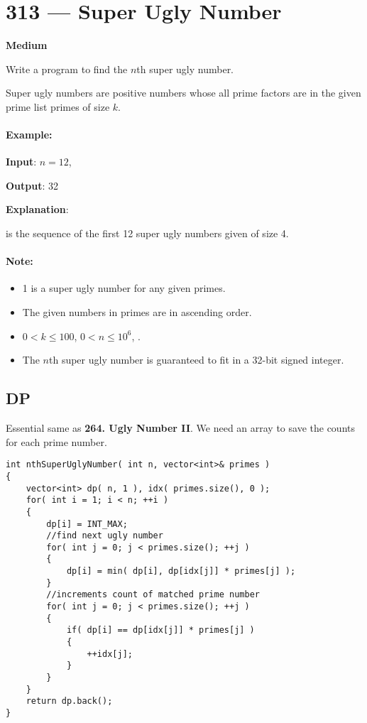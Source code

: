 \section{313 --- Super Ugly Number}

\textbf{Medium}

Write a program to find the $n$th super ugly number.

Super ugly numbers are positive numbers whose all prime factors are in the given prime list primes of size $k$.

\paragraph{Example:}

\begin{flushleft}
\textbf{Input}: $ n = 12 $, 

\textbf{Output}: 32 

\textbf{Explanation}: 

\fcj{[1,2,4,7,8,13,14,16,19,26,28,32]} is the sequence of the first 12 super ugly numbers given  of size 4.
\end{flushleft}

\paragraph{Note:}

\begin{itemize}
\item 1 is a super ugly number for any given primes.
\item The given numbers in primes are in ascending order.
\item $0 < k \leq 100$, $0 < n \leq 10^6$, .
\item The $n$th super ugly number is guaranteed to fit in a 32-bit signed integer.
\end{itemize}

\subsection{DP}
Essential same as \textbf{264. Ugly Number II}. We need an array to save the counts for each prime number.

\setcounter{lstlisting}{0}
\begin{lstlisting}[style=customc, caption={DP}]
int nthSuperUglyNumber( int n, vector<int>& primes )
{
    vector<int> dp( n, 1 ), idx( primes.size(), 0 );
    for( int i = 1; i < n; ++i )
    {
        dp[i] = INT_MAX;
        //find next ugly number
        for( int j = 0; j < primes.size(); ++j )
        {
            dp[i] = min( dp[i], dp[idx[j]] * primes[j] );
        }
        //increments count of matched prime number
        for( int j = 0; j < primes.size(); ++j )
        {
            if( dp[i] == dp[idx[j]] * primes[j] )
            {
                ++idx[j];
            }
        }
    }
    return dp.back();
}
\end{lstlisting}